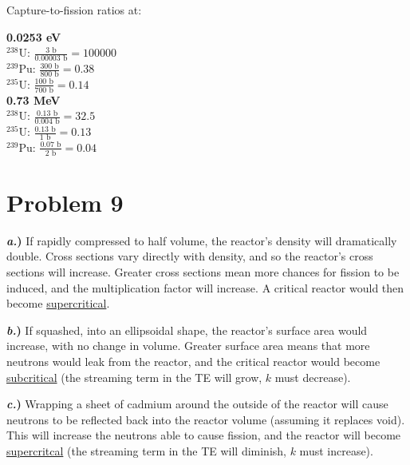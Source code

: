 \documentclass{article}
\newcommand{\tab}{\-\hspace{1cm}}
\begin{document}
Capture-to-fission ratios at:
\begin{multicols}{2}
\begin{onehalfspace}
\textbf{0.0253 eV}\\
$^{238}\text{U}$: \tab $\frac{3\text{ b}}{0.00003\text{ b}} = 100000$\\
$^{239}\text{Pu}$: \tab $\frac{300\text{ b}}{800\text{ b}} = 0.38$\\
$^{235}\text{U}$: \tab $\frac{100\text{ b}}{700\text{ b}} = 0.14$\\
\textbf{0.73 MeV}\\
$^{238}\text{U}$: \tab $\frac{0.13\text{ b}}{0.004\text{ b}} = 32.5$\\
$^{235}\text{U}$: \tab $\frac{0.13\text{ b}}{1\text{ b}} = 0.13$\\
$^{239}\text{Pu}$: \tab $\frac{0.07\text{ b}}{2\text{ b}} = 0.04$
\end{onehalfspace}
\end{multicols}




\section*{Problem 9}

\textbf{\textit{a.})} If rapidly compressed to half volume, the reactor's density will dramatically double. Cross sections vary directly with density, and so the reactor's cross sections will increase. Greater cross sections mean more chances for fission to be induced, and the multiplication factor will increase. A critical reactor would then become \underline{supercritical}.

\textbf{\textit{b.})} If squashed, into an ellipsoidal shape, the reactor's surface area would increase, with no change in volume. Greater surface area means that more neutrons would leak from the reactor, and the critical reactor would become \underline{subcritical} (the streaming term in the TE will grow, $k$ must decrease).

\textbf{\textit{c.})} Wrapping a sheet of cadmium around the outside of the reactor will cause neutrons to be reflected back into the reactor volume (assuming it replaces void). This will increase the neutrons able to cause fission, and the reactor will become \underline{supercritcal}  (the streaming term in the TE will diminish, $k$ must increase).
\end{document}
